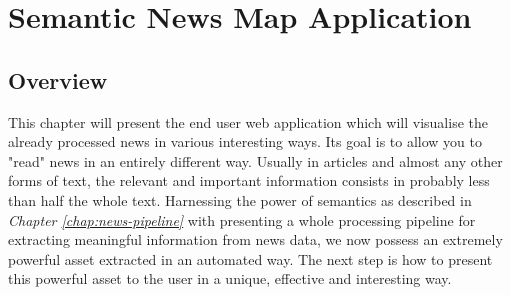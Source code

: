 \chapter{Semantic News Map Application}
\label{chap:semnews-app}

\section{Overview}
This chapter will present the end user web application which will visualise the already processed news in various interesting ways. Its goal is to allow you to "read" news in an entirely different way. Usually in articles and almost any other forms of text, the relevant and important information consists in probably less than half the whole text. Harnessing the power of semantics as described in \textit{Chapter \ref{chap:news-pipeline}} with presenting a whole processing pipeline for extracting meaningful information from news data, we now possess an extremely powerful asset extracted in an automated way. The next step is how to present this powerful asset to the user in a unique, effective and interesting way. 

